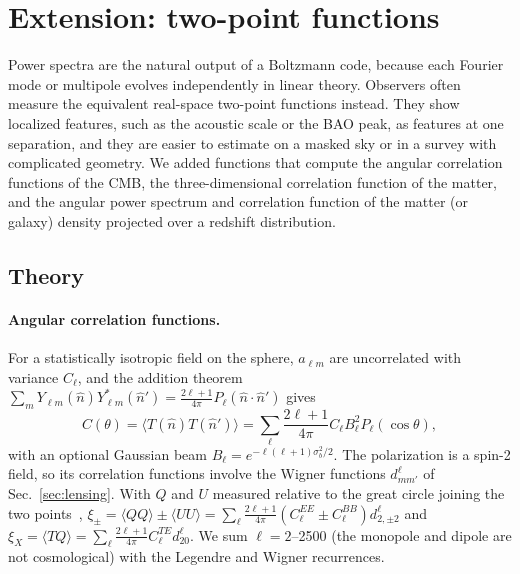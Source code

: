 \section{Extension: two-point functions}\label{sec:twopoint}

Power spectra are the natural output of a Boltzmann code, because each Fourier mode or multipole evolves
independently in linear theory. Observers often measure the equivalent real-space two-point functions instead. They
show localized features, such as the acoustic scale or the BAO peak, as features at one separation, and they are
easier to estimate on a masked sky or in a survey with complicated geometry. We added functions that compute the
angular correlation functions of the CMB, the three-dimensional correlation function of the matter, and the angular
power spectrum and correlation function of the matter (or galaxy) density projected over a redshift distribution.

\subsection{Theory}

\paragraph*{Angular correlation functions.} For a statistically isotropic field on the sphere,
$a_{\ell m}$ are uncorrelated with variance $C_\ell$, and the addition theorem
$\sum_mY_{\ell m}(\hat n)Y^*_{\ell m}(\hat n')=\frac{2\ell+1}{4\pi}P_\ell(\hat n\cdot\hat n')$ gives
\begin{equation}
C(\theta)=\langle T(\hat n)T(\hat n')\rangle=\sum_\ell\frac{2\ell+1}{4\pi}C_\ell B_\ell^2P_\ell(\cos\theta),
\label{eq:Ctheta}
\end{equation}
with an optional Gaussian beam $B_\ell=e^{-\ell(\ell+1)\sigma_b^2/2}$. The polarization is a spin-2 field, so its
correlation functions involve the Wigner functions $d^\ell_{mm'}$ of Sec.~\ref{sec:lensing}. With $Q$ and $U$ measured
relative to the great circle joining the two points~\cite{Challinor2005},
$\xi_\pm=\langle QQ\rangle\pm\langle UU\rangle=\sum_\ell\frac{2\ell+1}{4\pi}(C_\ell^{EE}\pm C_\ell^{BB})d^\ell_{2,\pm2}$
and $\xi_X=\langle TQ\rangle=\sum_\ell\frac{2\ell+1}{4\pi}C_\ell^{TE}d^\ell_{20}$. We sum
$\ell=2$--2500 (the monopole and dipole are not cosmological) with the Legendre and Wigner recurrences.

